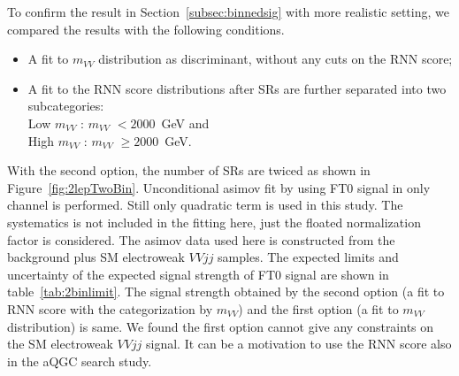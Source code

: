 To confirm the result in Section~\ref{subsec:binnedsig} with more realistic setting,
we compared the results with the following conditions.
\begin{itemize}
  \item A fit to $m_{VV}$ distribution as discriminant, without any cuts on the RNN score;
  \item A fit to the RNN score distributions after
        SRs are further separated into two subcategories: \\
        Low $m_{VV}$ : $m_{VV}$ $< 2000$~GeV and \\
        High $m_{VV}$ : $m_{VV}$ $\geq 2000$~GeV. \\
\end{itemize}
With the second option, the number of SRs are twiced as shown in Figure~\ref{fig:2lepTwoBin}.
Unconditional asimov fit by using FT0 signal in only \tlep channel is performed.
Still only quadratic term is used in this study.
The systematics is not included in the fitting here, just the floated normalization factor is considered.
The asimov data used here is constructed from the background plus SM electroweak $VVjj$ samples.
The expected limits and uncertainty of the expected signal strength of FT0 signal are shown in table~\ref{tab:2binlimit}.
The signal strength obtained by the second option (a fit to RNN score with the categorization by $m_{VV}$) and the first option (a fit to $m_{VV}$ distribution) is same. 
We found the first option cannot give any constraints on the SM electroweak $VVjj$ signal.
It can be a motivation to use the RNN score also in the aQGC search study.

